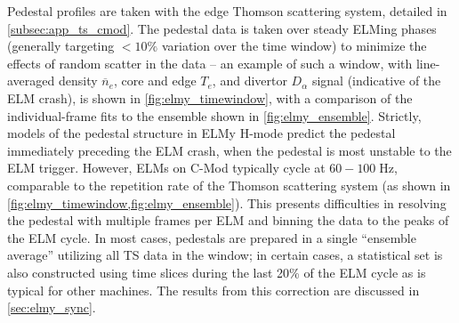 Pedestal profiles are taken with the edge Thomson scattering system, detailed in \cref{subsec:app_ts_cmod}.  The pedestal data is taken over steady ELMing phases (generally targeting $<10\%$ variation over the time window) to minimize the effects of random scatter in the data -- an example of such a window, with line-averaged density $\overline{n}_e$, core and edge $T_e$, and divertor $D_\alpha$ signal (indicative of the ELM crash), is shown in \cref{fig:elmy_timewindow}, with a comparison of the individual-frame fits to the ensemble shown in \cref{fig:elmy_ensemble}.  Strictly, models of the pedestal structure in ELMy H-mode predict the pedestal immediately preceding the ELM crash, when the pedestal is most unstable to the ELM trigger.  However, ELMs on C-Mod typically cycle at $60-100 \;\si{\hertz}$, comparable to the repetition rate of the Thomson scattering system (as shown in \cref{fig:elmy_timewindow,fig:elmy_ensemble}).  This presents difficulties in resolving the pedestal with multiple frames per ELM and binning the data to the peaks of the ELM cycle.  In most cases, pedestals are prepared in a single ``ensemble average'' utilizing all TS data in the window; in certain cases, a statistical set is also constructed using time slices during the last 20\% of the ELM cycle as is typical for other machines.  The results from this correction are discussed in \cref{sec:elmy_sync}.

\begin{figure}
 \pushtooutside
\end{figure}

